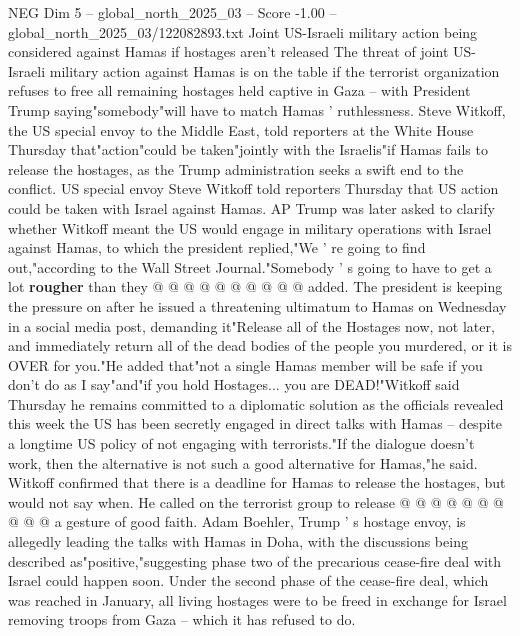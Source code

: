 \begin{textsample}{NEG Dim 5 – global\_north\_2025\_03 – Score -1.00 – global\_north\_2025\_03/122082893.txt}  \label{ex:f5_neg_258}
Joint US-Israeli military action being considered against Hamas if hostages aren't released The threat of joint US-Israeli military action against Hamas is on the table if the terrorist organization refuses to free all remaining hostages held captive in Gaza -- with President Trump saying"somebody"will have to match Hamas ' ruthlessness.
Steve Witkoff, the US special envoy to the Middle East, told reporters at the White House Thursday that"action"could be taken"jointly with the Israelis"if Hamas fails to release the hostages, as the Trump administration seeks a swift end to the conflict.
US special envoy Steve Witkoff told reporters Thursday that US action could be taken with Israel against Hamas.
AP Trump was later asked to clarify whether Witkoff meant the US would engage in military operations with Israel against Hamas, to which the president replied,"We ' re going to find out,"according to the Wall Street Journal."Somebody ' s going to have to get a lot \textbf{rougher} than they @ @ @ @ @ @ @ @ @ @ added.
The president is keeping the pressure on after he issued a threatening ultimatum to Hamas on Wednesday in a social media post, demanding it"Release all of the Hostages now, not later, and immediately return all of the dead bodies of the people you murdered, or it is OVER for you."He added that"not a single Hamas member will be safe if you don't do as I say"and"if you hold Hostages... you are DEAD!"Witkoff said Thursday he remains committed to a diplomatic solution as the officials revealed this week the US has been secretly engaged in direct talks with Hamas -- despite a longtime US policy of not engaging with terrorists."If the dialogue doesn't work, then the alternative is not such a good alternative for Hamas,"he said.
Witkoff confirmed that there is a deadline for Hamas to release the hostages, but would not say when.
He called on the terrorist group to release @ @ @ @ @ @ @ @ @ @ a gesture of good faith.
Adam Boehler, Trump ' s hostage envoy, is allegedly leading the talks with Hamas in Doha, with the discussions being described as"positive,"suggesting phase two of the precarious cease-fire deal with Israel could happen soon.
Under the second phase of the cease-fire deal, which was reached in January, all living hostages were to be freed in exchange for Israel removing troops from Gaza -- which it has refused to do.

\end{textsample}
